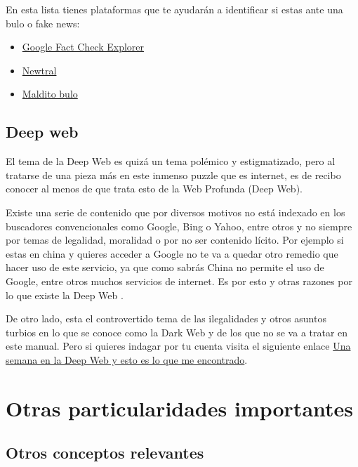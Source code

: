 \documentclass[
  spanish,
  a4paper,
  openany]{book}
\begin{document}
En esta lista tienes plataformas que te ayudarán a identificar si estas ante una bulo o fake news:

\begin{itemize}
\item
  \href{https://toolbox.google.com/factcheck/explorer}{Google Fact Check Explorer}
\item
  \href{https://www.newtral.es/zona-verificacion/fact-check/}{Newtral}
\item
  \href{https://maldita.es/malditobulo/1}{Maldito bulo}
\end{itemize}

\hypertarget{deep-web}{%
\section{Deep web}\label{deep-web}}

El tema de la Deep Web es quizá un tema polémico y estigmatizado, pero al tratarse de una pieza más en este inmenso puzzle que es internet, es de recibo conocer al menos de que trata esto de la Web Profunda (Deep Web).

Existe una serie de contenido que por diversos motivos no está indexado en los buscadores convencionales como Google, Bing o Yahoo, entre otros y no siempre por temas de legalidad, moralidad o por no ser contenido lícito. Por ejemplo si estas en china y quieres acceder a Google no te va a quedar otro remedio que hacer uso de este servicio, ya que como sabrás China no permite el uso de Google, entre otros muchos servicios de internet. Es por esto y otras razones por lo que existe la Deep Web \citep{OSI-deep-web}.

De otro lado, esta el controvertido tema de las ilegalidades y otros asuntos turbios en lo que se conoce como la Dark Web y de los que no se va a tratar en este manual. Pero si quieres indagar por tu cuenta visita el siguiente enlace \href{https://www.xataka.com/analisis/una-semana-en-la-deep-web-esto-es-lo-que-me-he-encontrado}{Una semana en la Deep Web y esto es lo que me encontrado}.

\hypertarget{otras-particularidades-importantes}{%
\chapter{Otras particularidades importantes}\label{otras-particularidades-importantes}}

\hypertarget{otros-conceptos-relevantes}{%
\section{Otros conceptos relevantes}\label{otros-conceptos-relevantes}}
\end{document}
